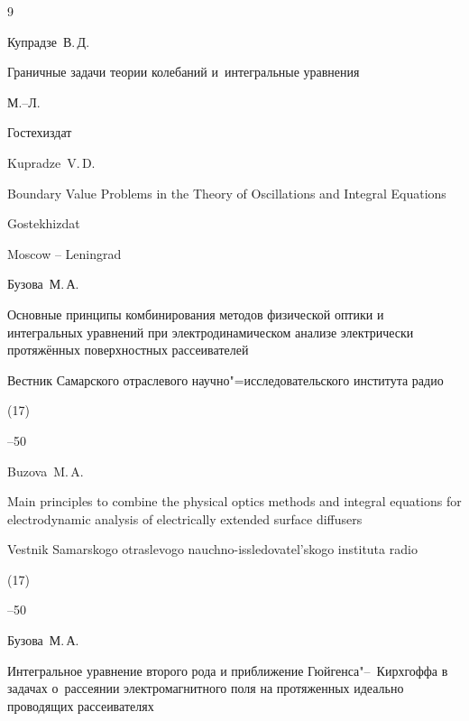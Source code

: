 \begin{thebibliography}{9}





\by Купрадзе~В.\,Д.

\book Граничные задачи теории колебаний и~интегральные уравнения 

\publaddr М.--Л.

\publ Гостехиздат



\misctransl

\by Kupradze~V.\,D. 

\book Boundary Value Problems in the Theory of Oscillations and Integral Equations 

\publ Gostekhizdat

\publaddr Moscow -- Leningrad 






\by Бузова~М.\,А.

\paper Основные принципы комбинирования методов физической оптики и интегральных уравнений при электродинамическом анализе электрически протяжённых поверхностных рассеивателей 

\jour Вестник Самарского отраслевого научно"=исследовательского института радио


(17)

--50

\misctransl

\by Buzova~M.\,A.

\paper Main principles to combine the physical optics methods and integral equations for electrodynamic analysis of electrically extended surface diffusers


\jour Vestnik Samarskogo otraslevogo nauchno-issledovatel'skogo insti\-tuta radio

(17)

--50




\by Бузова~М.\,А.

\paper Интегральное уравнение второго рода и приближение Гюйгенса"--~Кирхгоффа в задачах о~рассеянии электромагнитного поля на протяженных идеально проводящих рассеивателях 


\end{thebibliography}
